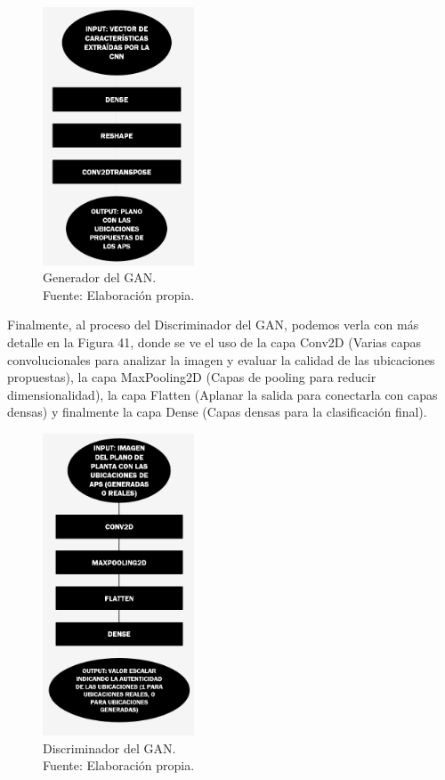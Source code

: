 \begin{figure}[H]
	\centering
	\includegraphics[width=0.4\textwidth]{3/figures/gans_capas.jpg}
	\caption[Generador del GAN]{Generador del GAN.\\ Fuente: Elaboración propia.}
	\label{3:5}
\end{figure}

Finalmente, al proceso del Discriminador del GAN, podemos verla con más detalle en la Figura 41, donde se ve el uso de la capa Conv2D (Varias capas convolucionales para analizar la imagen y evaluar la calidad de las ubicaciones propuestas), la capa MaxPooling2D (Capas de pooling para reducir dimensionalidad), la capa Flatten (Aplanar la salida para conectarla con capas densas) y finalmente la capa Dense (Capas densas para la clasificación final).

\begin{figure}[H]
	\centering
	\includegraphics[width=0.4\textwidth]{3/figures/discrimGAN.jpg}
	\caption[Discriminador del GAN]{Discriminador del GAN.\\ Fuente: Elaboración propia.}
	\label{3:6}
\end{figure}

